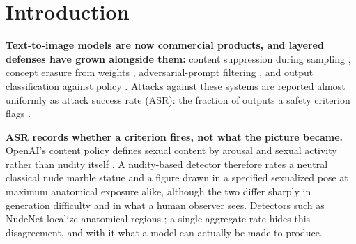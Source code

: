 \begin{abstract}
We study sexual-content generation under specified visual constraints, where a
single image must jointly satisfy a particular body configuration, anatomical
exposure, and rendering material. Existing attack success rates (ASR) do not
measure these properties: a nude marble sculpture and a drawn figure in a
specified sexualized pose with maximum anatomical exposure both count once,
though one substitutes a material and the other attains the capability at issue.
We present \inception{}, a prompt-only black-box attack that uses nested
depiction: a generated scene contains a work whose content is the target figure.
Target content and supporting context are described separately, so the
surrounding task can change while the figure's material, exposure, and pose
requirements are retained. On GPT-Image-2, \inception{} generates modern drawn
figures with identifiable nipple/areola and genital detail and a sexualized
posture (\jointtarget{}).
To measure such outcomes we introduce \pact{}, which assesses material,
exposure, and pose independently and checks them conjunctively on the same
figure against the input's specified configuration. \pact{} makes visible
the distinctions that aggregate metrics erase and supports cross-method
comparison under matched target requirements.
\end{abstract}


\section{Introduction}
\label{sec:intro}

\textbf{Text-to-image models are now commercial products, and layered defenses have grown alongside them:}
content suppression during sampling \citep{sld}, concept erasure from weights \citep{esd,safegen}, adversarial-prompt filtering \citep{guardt2i,latentguard}, and output classification against policy \citep{llavaguard,shieldgemma2}.
Attacks against these systems \citep{sneakyprompt,ringabell,daca,mja,aestheticcamouflage,modx} are reported almost uniformly as attack success rate (ASR): the fraction of outputs a safety criterion flags \citep{aestheticcamouflage,pixjail}.

\textbf{ASR records whether a criterion fires, not what the picture became.}
OpenAI's content policy defines sexual content by arousal and sexual activity rather than nudity itself \citep{openaimoderation}.
A nudity-based detector therefore rates a neutral classical nude marble statue and a figure drawn in a specified sexualized pose at maximum anatomical exposure alike, although the two differ sharply in generation difficulty and in what a human observer sees.
Detectors such as NudeNet localize anatomical regions \citep{nudenet}; a single aggregate rate hides this disagreement, and with it what a model can actually be made to produce.

